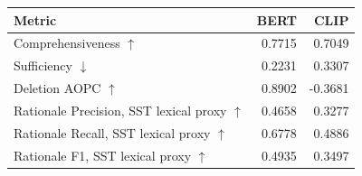 \begin{tabular}{lrr}
\hline
Metric & BERT & CLIP \\
\hline
Comprehensiveness $\uparrow$ & 0.7715 & 0.7049 \\
Sufficiency $\downarrow$ & 0.2231 & 0.3307 \\
Deletion AOPC $\uparrow$ & 0.8902 & -0.3681 \\
Rationale Precision, SST lexical proxy $\uparrow$ & 0.4658 & 0.3277 \\
Rationale Recall, SST lexical proxy $\uparrow$ & 0.6778 & 0.4886 \\
Rationale F1, SST lexical proxy $\uparrow$ & 0.4935 & 0.3497 \\
\hline
\end{tabular}
